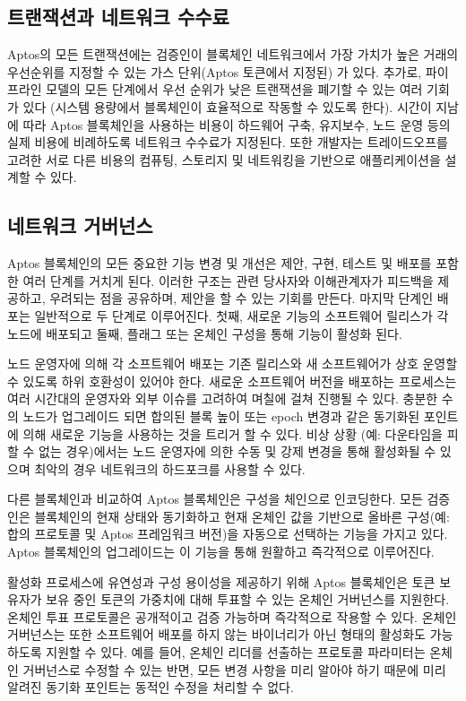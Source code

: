 \documentclass{article}
\begin{document}
\subsection{트랜잭션과 네트워크 수수료}
\label{subsec:network_fees}

Aptos의 모든 트랜잭션에는 검증인이 블록체인 네트워크에서 가장 가치가 높은 거래의 우선순위를 지정할 수 있는 가스 단위(Aptos 토큰에서 지정된) 가 있다. 추가로, 파이프라인 모델의 모든 단계에서 우선 순위가 낮은 트랜잭션을 폐기할 수 있는 여러 기회가 있다 (시스템 용량에서 블록체인이 효율적으로 작동할 수 있도록 한다). 시간이 지남에 따라 Aptos 블록체인을 사용하는 비용이 하드웨어 구축, 유지보수, 노드 운영 등의 실제 비용에 비례하도록 네트워크 수수료가 지정된다. 또한 개발자는 트레이드오프를 고려한 서로 다른 비용의 컴퓨팅, 스토리지 및 네트워킹을 기반으로 애플리케이션을 설계할 수 있다.

\subsection{네트워크 거버넌스}
\label{subsec:network_governance}

Aptos 블록체인의 모든 중요한 기능 변경 및 개선은 제안, 구현, 테스트 및 배포를 포함한 여러 단계를 거치게 된다. 이러한 구조는 관련 당사자와 이해관계자가 피드백을 제공하고, 우려되는 점을 공유하며, 제안을 할 수 있는 기회를 만든다. 마지막 단계인 배포는 일반적으로 두 단계로 이루어진다. 첫째, 새로운 기능의 소프트웨어 릴리스가 각 노드에 배포되고 둘째, 플래그 또는 온체인 구성을 통해 기능이 활성화 된다.

노드 운영자에 의해 각 소프트웨어 배포는 기존 릴리스와 새 소프트웨어가 상호 운영할 수 있도록 하위 호환성이 있어야 한다. 새로운 소프트웨어 버전을 배포하는 프로세스는 여러 시간대의 운영자와 외부 이슈를 고려하여 며칠에 걸쳐 진행될 수 있다. 충분한 수의 노드가 업그레이드 되면 합의된 블록 높이 또는 epoch 변경과 같은 동기화된 포인트에 의해 새로운 기능을 사용하는 것을 트리거 할 수 있다. 비상 상황 (예: 다운타임을 피할 수 없는 경우)에서는 노드 운영자에 의한 수동 및 강제 변경을 통해 활성화될 수 있으며 최악의 경우 네트워크의 하드포크를 사용할 수 있다.

다른 블록체인과 비교하여 Aptos 블록체인은 구성을 체인으로 인코딩한다. 모든 검증인은 블록체인의 현재 상태와 동기화하고 현재 온체인 값을 기반으로 올바른 구성(예: 합의 프로토콜 및 Aptos 프레임워크 버전)을 자동으로 선택하는 기능을 가지고 있다. Aptos 블록체인의 업그레이드는 이 기능을 통해 원활하고 즉각적으로 이루어진다.

활성화 프로세스에 유연성과 구성 용이성을 제공하기 위해 Aptos 블록체인은 토큰 보유자가 보유 중인 토큰의 가중치에 대해 투표할 수 있는 온체인 거버넌스를 지원한다. 온체인 투표 프로토콜은 공개적이고 검증 가능하며 즉각적으로 작용할 수 있다. 온체인 거버넌스는 또한 소프트웨어 배포를 하지 않는 바이너리가 아닌 형태의 활성화도 가능하도록 지원할 수 있다. 예를 들어, 온체인 리더를 선출하는 프로토콜 파라미터는 온체인 거버넌스로 수정할 수 있는 반면, 모든 변경 사항을 미리 알아야 하기 때문에 미리 알려진 동기화 포인트는 동적인 수정을 처리할 수 없다.
\end{document}
